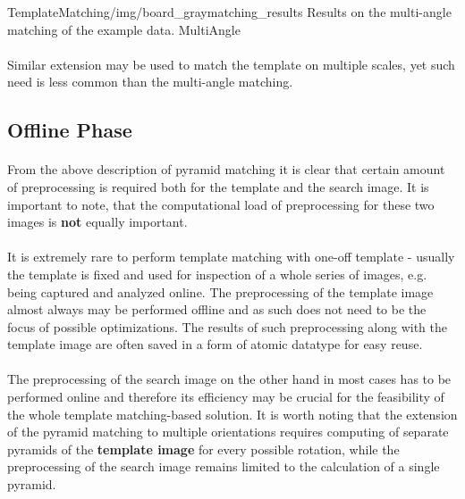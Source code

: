 \oneFigure
{TemplateMatching/img/board_graymatching_results}
{Results on the multi-angle matching of the example data.}
{MultiAngle}
{\basicWidth}

\paragraph*{}
Similar extension may be used to match the template on multiple scales, yet such need is less common than the multi-angle matching.

\subsection{Offline Phase}

\paragraph*{}
From the above description of pyramid matching it is clear that certain amount of preprocessing is required both for the template and the search image. It is important to note, that the computational load of preprocessing for these two images is \textbf{not} equally important.

\paragraph*{}
It is extremely rare to perform template matching with one-off template - usually the template is fixed and used for inspection of a whole series of images, e.g. being captured and analyzed online. The preprocessing of the template image almost always may be performed offline and as such does not need to be the focus of possible optimizations. The results of such preprocessing along with the template image are often saved in a form of atomic datatype for easy reuse.

\paragraph*{}
The preprocessing of the search image on the other hand in most cases has to be performed online and therefore its efficiency may be crucial for the feasibility of the whole template matching-based solution. It is worth noting that the extension of the pyramid matching to multiple orientations requires computing of separate pyramids of the \textbf{template image} for every possible rotation, while the preprocessing of the search image remains limited to the calculation of a single pyramid.  

